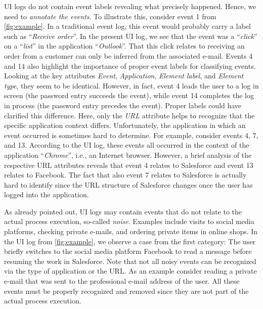 UI logs do not contain event labels revealing what precisely happened. Hence, we need to \textit{annotate the events}. To illustrate this, consider event 1 from \autoref{fig:example}. In a traditional event log, this event would probably carry a label such as ``\textit{Receive order}''. In the present UI log, we see that the event was a ``\textit{click}'' on a ``\textit{list}'' in the application ``\textit{Outlook}''. That this click relates to receiving an order from a customer can only be inferred from the associated e-mail. Events 4 and 14 also highlight the importance of proper event labels for classifying events. Looking at the key attributes \textit{Event}, \textit{Application}, \textit{Element label}, and \textit{Element type}, they seem to be identical. However, in fact, event 4 leads the user to a log in screen (the password entry succeeds the event), while event 14 completes the log in process (the password entry precedes the event). Proper labels could have clarified this difference. Here, only the \textit{URL} attribute helps to recognize that the specific application context differs. Unfortunately, the application in which an event occurred is sometimes hard to determine. For example, consider events 4, 7, and 13. According to the UI log, these events all occurred in the context of the application ``\textit{Chrome}'', i.e., an Internet browser. However, a brief analysis of the respective URL attributes reveals that event 4 relates to Salesforce and event 13 relates to Facebook. The fact that also event 7 relates to Salesforce is actually hard to identify since the URL structure of Salesforce changes once the user has logged into the application.

As already pointed out, UI logs may contain events that do not relate to the actual process execution, so-called \textit{noise}. Examples include visits to social media platforms, checking private e-mails, and ordering private items in online shops. In the UI log from \autoref{fig:example}, we observe a case from the first category: The user briefly switches to the social media platform Facebook to read a message before resuming the work in Salesforce. Note that not all noisy events can be recognized via the type of application or the URL. As an example consider reading a private e-mail that was sent to the professional e-mail address of the user. All these events must be properly recognized and removed since they are not part of the actual process execution. 
  
